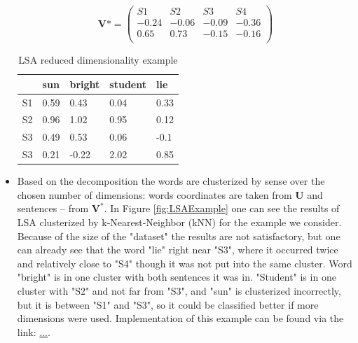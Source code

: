 \begin{itemize}
\begin{equation} \label{eq:V0}
\boldsymbol V* = \begin{pmatrix}
S1 & S2 & S3 & S4 \\
-0.24 & -0.06 & -0.09 & -0.36 \\
 0.65 & 0.73 & -0.15 & -0.16 \\
\end{pmatrix}
\end{equation}

\begin{table}[h!]
\centering
\caption{LSA reduced dimensionality example}
\label{LSAR}
\begin{tabular}{|l|l|l|l|l|}
\hline
 & sun & bright & student  & lie \\ \hline
S1 & 0.59 & 0.43 & 0.04 & 0.33 \\ \hline
S2 & 0.96 & 1.02 & 0.95 & 0.12 \\ \hline
S3 & 0.49 & 0.53 & 0.06 & -0.1 \\ \hline
S3 & 0.21 & -0.22 & 2.02 & 0.85 \\ \hline
\end{tabular}
\end{table}

\item Based on the decomposition the words are clusterized by sense over the chosen number of dimensions: words coordinates are taken from $\boldsymbol U$ and sentences -- from $\boldsymbol{V^*}$. In Figure \ref{fig:LSAExample} one can see the results of LSA clusterized by k-Nearest-Neighbor (kNN) for the example we consider. Because of the size of the "dataset" the results are not satisfactory, but one can already see that the word "lie" right near "S3", where it occurred twice and relatively close to "S4" though it was not put into the same cluster. Word "bright" is in one cluster with both sentences it was in. "Student" is in one cluster with "S2" and not far from "S3", and "sun" is clusterized incorrectly, but it is between "S1" and "S3", so it could be classified better if more dimensions were used. Implementation of this example can be found via the link: \url{...}.


\end{itemize}
